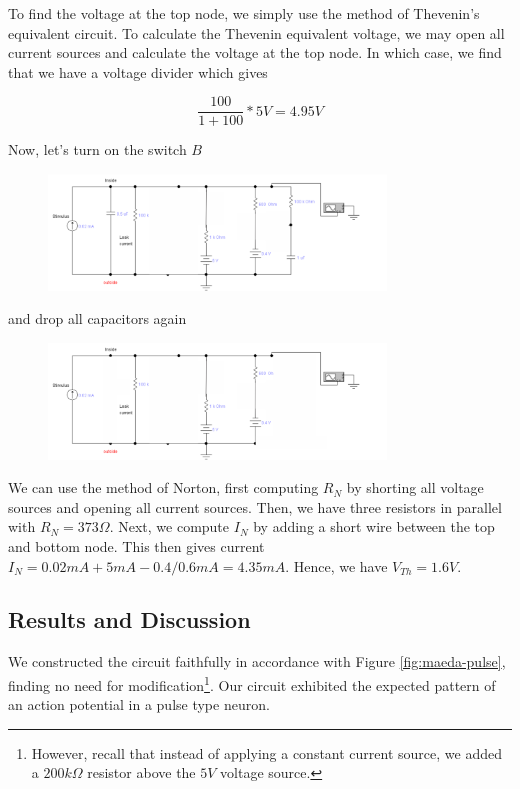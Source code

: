 \documentclass[12]{book}
\newcommand\0{\mathbf{0}}
\newcommand\<{\langle}
\renewcommand\>{\rangle}
\begin{document}
To find the voltage at the top node, we simply use the method of Thevenin's equivalent circuit\cite{fortney1987principles}. To calculate the Thevenin equivalent voltage, we may open all current sources and calculate the voltage at the top node. In which case, we find that we have a voltage divider which gives 

$$\frac{100}{1+100} * 5V = 4.95 V$$

Now, let's turn on the switch $B$
 
 \begin{figure}[h]
\includegraphics[width=0.8\textwidth]{exercise1-5}
\end{figure}

and drop all capacitors again
 
\begin{figure}[H]
\centering
\includegraphics[width=0.8\textwidth]{exercise1-6}
\end{figure}

We can use the method of Norton, first computing $R_{N}$ by shorting all voltage sources and opening all current sources. Then, we have three resistors in parallel with $R_{N} = 373 \Omega$. Next, we compute $I_N$ by adding a short wire between the top and bottom node. This then gives current $I_N = 0.02 mA + 5 mA - 0.4/0.6 mA = 4.35 mA$. Hence, we have $V_{Th} = 1.6 V$.

\subsection{Results and Discussion}

We constructed the circuit faithfully in accordance with Figure \ref{fig:maeda-pulse}, finding no need for modification\footnote{However, recall that instead of applying a constant current source, we added a $200k\Omega$ resistor above the $5V$ voltage source.}. Our circuit exhibited the expected pattern of an action potential in  a pulse type neuron.
\end{document}

